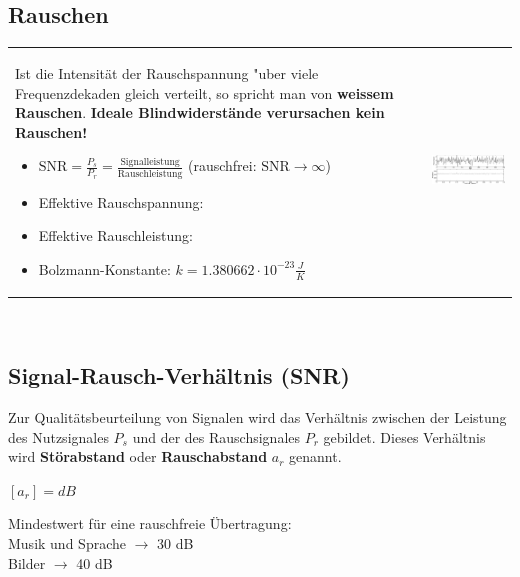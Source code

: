 	\subsection{Rauschen  }
		\begin{tabularx}{\textwidth}{lX}
			\parbox{9.5cm}{
			Ist die Intensität der
			Rauschspannung "uber viele Frequenzdekaden
			gleich verteilt, so spricht man von \textbf{weissem Rauschen}.\\ \\
			\textbf{Ideale Blindwiderstände verursachen kein Rauschen!}
			\begin{itemize}
     			\item $\text{SNR} = \frac{P_s}{P_r} = \frac{\text{Signalleistung}}{\text{Rauschleistung}}$ (rauschfrei: $ \text{SNR} \rightarrow \infty$) 
     			\item Effektive Rauschspannung: 
     			\item Effektive Rauschleistung: 
     			\item Bolzmann-Konstante: $k =1.380662 \cdot 10^{-23}\frac{J}{K}$
   			\end{itemize}
			}
			&
			\parbox{8cm}{
				\includegraphics[width=8cm]{./bilder/rauschen2.png}
			}
		\end{tabularx}\\
		
	\subsection{Signal-Rausch-Verhältnis (SNR) }
		Zur Qualitätsbeurteilung von Signalen wird das Verhältnis zwischen der Leistung des Nutzsignales $P_s$ und der 
		des Rauschsignales $P_r$ gebildet. Dieses Verhältnis wird \textbf{Störabstand} oder \textbf{Rauschabstand} $a_r$ genannt.\\
	
		\begin{minipage}[]{10cm}
			$[a_r] = dB$\\
		\end{minipage}
		\begin{minipage}[]{10cm}		
			Mindestwert für eine rauschfreie Übertragung: \\
			Musik und Sprache $\rightarrow$ 30 dB \\
			Bilder $\rightarrow$ 40 dB
		\end{minipage}
	
